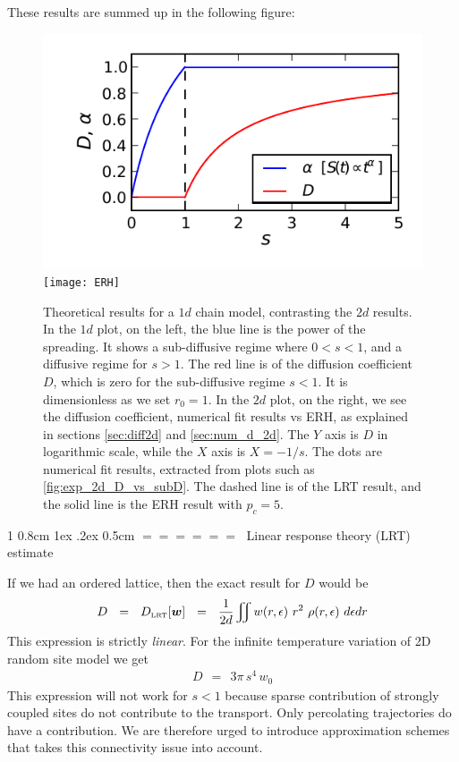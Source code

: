 \documentclass[onecolumn,fleqn,notitlepage,secnumarabic]{revtex4}
\makeatletter
\newcommand{\tbox}[1]{\mbox{\tiny #1}}
\newcommand{\beq}{\begin{eqnarray}}
\newcommand{\eeq}{\end{eqnarray}}
\def\section{%
  \@startsection
    {section}%
    {1}%
    {\z@}%
    {0.8cm \@plus1ex \@minus .2ex}%
    {0.5cm}%
    {\Large\bf $=\!=\!=\!=\!=\!=\;$}%
}%
\makeatother
\begin{document}
These results are summed up in the following figure:
\begin{figure}[H]
  \includegraphics{alexander}
  \texttt{[image: ERH]}
  \caption{Theoretical results for a $1d$ chain model, contrasting the $2d$ results. In the $1d$ plot, on the left, the blue line is the power of the spreading. It shows a sub-diffusive regime where $0<s<1$, and a diffusive regime for $s>1$. The red line is of the diffusion coefficient $D$, which is zero for the sub-diffusive regime $s<1$. It is dimensionless as we set $r_0=1$. In the $2d$ plot, on the right, we see the diffusion coefficient, numerical fit results vs ERH, as explained in sections \ref{sec:diff2d} and \ref{sec:num_d_2d}. The $Y$ axis is $D$ in logarithmic scale, while the $X$ axis is $X=-1/s$. The dots are numerical fit results, extracted from plots such as \ref{fig:exp_2d_D_vs_subD}. The dashed line is of the LRT result, and the solid line is the ERH result with $p_c = 5$.}
\end{figure}
\section{Linear response theory (LRT) estimate}

If we had an ordered lattice, then the exact result for $D$ would be 
%
\beq
D \ \ = \ \ D_{\tbox{LRT}}[\bm{w}]  \ \ = \ \ \frac{1}{2d}\iint w(r,\epsilon) \ r^2  \ \rho(r,\epsilon) \ d\epsilon dr 
\eeq
%
This expression is strictly {\em linear}.
For the infinite temperature variation of 2D random site model we get  
%
\beq
D \ \ = \ \ 3\pi \, s^4 \, w_0
\eeq
%
This expression will not work for ${s<1}$ because sparse contribution 
of strongly coupled sites do not contribute to the transport. 
Only percolating trajectories do have a contribution. We are therefore urged 
to introduce approximation schemes that takes this connectivity 
issue into account.  
 
\end{document}
